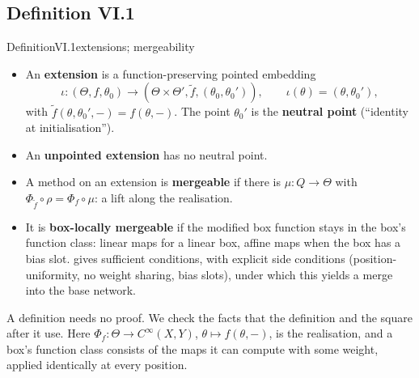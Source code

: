 \subsection{Definition VI.1}\label{proof:VI.1}

\begin{restate}{Definition}{VI.1}{extensions; mergeability}
\begin{itemize}
  \item An \textbf{extension} is a function-preserving pointed embedding
  \[\iota:(\Theta,f,\theta_0)\to(\Theta\times\Theta',\tilde f,(\theta_0,\theta_0')),\qquad\iota(\theta)=(\theta,\theta_0'),\]
  with $\tilde f(\theta,\theta_0',-)=f(\theta,-)$. The point $\theta_0'$ is the \textbf{neutral point} (``identity at
  initialisation'').
  \item An \textbf{unpointed extension} has no neutral point.
  \item A method on an extension is \textbf{mergeable} if there is $\mu:Q\to\Theta$ with
  $\Phi_{\tilde f}\circ\rho=\Phi_f\circ\mu$: a lift along the realisation.
  \item It is \textbf{box-locally mergeable} if the modified box function stays in the box's function class: linear maps
  for a linear box, affine maps when the box has a bias slot.  gives sufficient conditions, with
  explicit side conditions (position-uniformity, no weight sharing, bias slots), under which this yields a merge into the
  base network.
\end{itemize}
\end{restate}

A definition needs no proof. We check the facts that the definition and the square after it use. Here
$\Phi_f:\Theta\to C^\infty(X,Y)$, $\theta\mapsto f(\theta,-)$, is the realisation, and a box's function class consists of the
maps it can compute with some weight, applied identically at every position.

